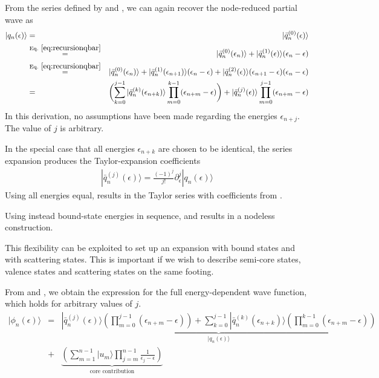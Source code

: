 \documentclass[11pt,a4paper]{report}
\begin{document}
From the series defined by  and
, we can again recover the node-reduced partial
wave as
\begin{eqnarray}
|q_n(\epsilon)\rangle&=&|\bar{q}_n^{(0)}(\epsilon)\rangle
\nonumber\\
&\eqrel{eq:recursionqbar}{=}&|\bar{q}_n^{(0)}(\epsilon_n)\rangle
+|\bar{q}_{n}^{(1)}(\epsilon)\rangle(\epsilon_n-\epsilon)
\nonumber\\
&\eqrel{eq:recursionqbar}{=}&|\bar{q}_n^{(0)}(\epsilon_n)\rangle
+|\bar{q}_{n}^{(1)}(\epsilon_{n+1})\rangle(\epsilon_n-\epsilon)
+|\bar{q}_{n}^{(2)}(\epsilon)\rangle
(\epsilon_{n+1}-\epsilon)(\epsilon_{n}-\epsilon)
\nonumber\\
&=&\biggl(\sum_{k=0}^{j-1}
|\bar{q}_{n}^{(k)}(\epsilon_{n+k})\rangle
\prod_{m=0}^{k-1}(\epsilon_{n+m}-\epsilon)\biggr)
+|\bar{q}_n^{(j)}(\epsilon)\rangle
\prod_{m=0}^{j-1}(\epsilon_{n+m}-\epsilon)
\label{eq:qnfromqj}
\end{eqnarray}
In this derivation, no assumptions have been made regarding the
energies $\epsilon_{n+j}$. The value of $j$ is arbitrary.


In the special case that all energies $\epsilon_{n+k}$ are chosen to
be identical, the series expansion  produces the
Taylor-expansion coefficients
\begin{eqnarray}
|\bar{q}_n^{(j)}(\epsilon)\rangle=
\frac{(-1)^j}{j!}\partial_\epsilon^j|q_n(\epsilon)\rangle
\label{eq:taylorexpansioncoefficientsqn}
\end{eqnarray}
Using all energies equal,  results in the Taylor
series with coefficients from .

Using instead bound-state energies in sequence,  and
 results in a nodeless construction.

This flexibility can be exploited to set up an expansion with bound
states and with scattering states. This is important if we wish to
describe semi-core states, valence states and scattering states on the
same footing.

From  and , we obtain the
expression for the full energy-dependent wave function, which holds
for arbitrary values of $j$.
\begin{eqnarray}
|\phi_n(\epsilon)\rangle
&=&
\underbrace{
|\bar{q}_n^{(j)}(\epsilon)\rangle
\left(\prod_{m=0}^{j-1}(\epsilon_{n+m}-\epsilon)\right)
+
\sum_{k=0}^{j-1}
|\bar{q}_{n}^{(k)}(\epsilon_{n+k})\rangle
\left(\prod_{m=0}^{k-1}(\epsilon_{n+m}-\epsilon)\right)
}_{|q_n(\epsilon)\rangle}
\nonumber\\
&+&
\underbrace{
\left(\sum_{m=1}^{n-1}|u_m\rangle\prod_{j=m}^{n-1}\frac{1}{\epsilon_j-\epsilon}\right)
}_{\text{core contribution}}
\label{eq:phincompletediscreteandcont}
\end{eqnarray}
\end{document}
